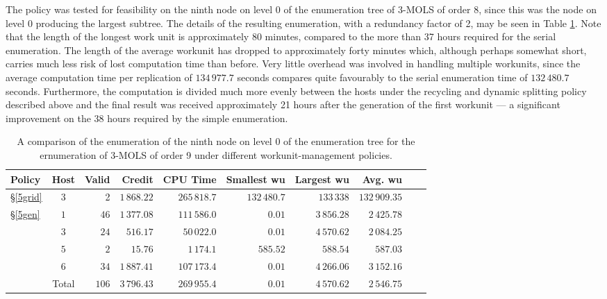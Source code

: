  The policy was   tested  for feasibility on the ninth node on level 0 of the enumeration tree of 3-MOLS of order 8, since this was the node on level 0 producing the largest subtree. The details of the resulting enumeration, with a redundancy factor of 2, may be seen in Table \ref{839splits}. Note that the length of the longest work unit is approximately 80 minutes, compared to the more than 37 hours required for  the serial enumeration. The length of the average workunit has dropped to approximately forty minutes which, although perhaps somewhat short, carries much less risk of lost computation time than before. Very little overhead was involved in handling multiple workunits, since the average computation time per replication of $134\,977.7$ seconds compares quite favourably to the serial enumeration time of $132\,480.7$ seconds. Furthermore, the computation is divided much more evenly between the hosts under the recycling and dynamic splitting policy described above and the final result was received approximately 21 hours after the generation of the first workunit --- a significant improvement on the 38 hours required by the simple enumeration.
\begin{table}[t]
 \centering
 \caption{A comparison of the enumeration of the ninth node on level 0 of the enumeration tree for the ernumeration of 3-MOLS of order 9 under different workunit-management policies.}
\begin{tabular}{lcrrrrrrrr}
\toprule
Policy & Host   & Valid   & Credit   & CPU Time& Smallest wu & Largest wu& Avg. wu\\ \midrule
\S\ref{5grid} & 3 & 2 & $1\,868.22$ & $265\,818.7$ & $132\,480.7$ &$133\,338$& $132\,909.35$\\ \midrule
\multirow{5}{1.1cm}{\S\ref{5gen}} &$1$   & $46$  & $1\,377.08$ & $111\,586.0$ & $0.01$ & $3\,856.28$ & $2\,425.78$ \\
&$3$   & $24$  & $516.17$ & $50\,022.0$ & $0.01$ & $4\,570.62$ & $2\,084.25$ \\
&$5$   & $2$   & $15.76$ & $1\,174.1$ & $585.52$ & $588.54$ & $587.03$ \\
&$6$   & $34$  & $1\,887.41$ & $107\,173.4$ & $0.01$ & $4\,266.06$ & $3\,152.16$ \\ \cmidrule{2-8}
& Total   & $106$  & $3\,796.43$& $269\,955.4$ & $0.01$& $4\,570.62$ & $2\,546.75$\\ \bottomrule
\end{tabular}\vspace*{-.4cm}
\label{839splits}
\end{table}


